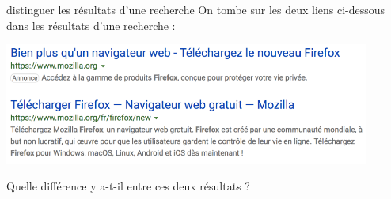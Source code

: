 \documentclass[a4paper, dvipsnames]{article}
\begin{document}
\medskip

\begin{activite}{distinguer les résultats d'une recherche}{}
  On tombe sur les deux liens ci-dessous dans les résultats d'une recherche :

  \begin{center}
    \includegraphics[width=12cm]{ch_1_recherche_firefox.png}
  \end{center}

  Quelle différence y a-t-il entre ces deux résultats ?
\end{activite}
\end{document}
